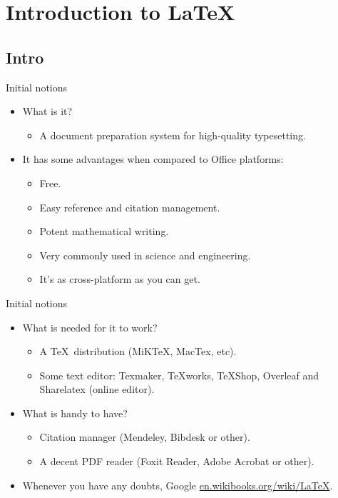 \documentclass[usenames,dvipsnames,aspectratio=169]{beamer}
\newcommand{\aitem}{\item[$\cdot$]}
\newcommand{\bitem}{\item[-]}
\begin{document}
\section{Introduction to \LaTeX}
\subsection{Intro}
\begin{frame}[t]{Initial notions}
\begin{itemize}
\aitem What is it?
\begin{itemize}
\bitem A document preparation system for high-quality typesetting.
\end{itemize}
\aitem It has some advantages when compared to Office platforms:
\begin{itemize}
\bitem Free.
\bitem Easy reference and citation management.
\bitem Potent mathematical writing.
\bitem Very commonly used in science and engineering.
\bitem It's as cross-platform as you can get.
\end{itemize}
\end{itemize}
\end{frame}


\begin{frame}[t]{Initial notions}
\begin{itemize}
\aitem What is needed for it to work?
\begin{itemize}
\bitem A \TeX~distribution (MiKTeX, MacTex, etc).
\bitem Some text editor: Texmaker, TeXworks, TeXShop, Overleaf and Sharelatex (online editor).
\end{itemize}
\aitem What is handy to have?
\begin{itemize}
\bitem Citation manager (Mendeley, Bibdesk or other).
\bitem A decent PDF reader (Foxit Reader, Adobe Acrobat or other).
\end{itemize}
\aitem Whenever you have any doubts, Google \textcolor{blue}{\url{en.wikibooks.org/wiki/LaTeX}}.
\end{itemize}
\end{frame}

\end{document}
